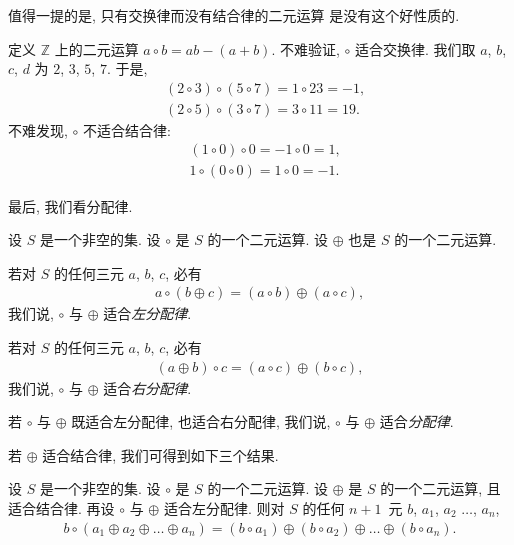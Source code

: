 值得一提的是, 只有交换律而没有结合律的二元运算%
是没有这个好性质的.

\begin{example}
    定义 \(\mathbb{Z}\) 上的二元运算
    \(a \circ b = ab - (a + b)\).
    不难验证, \(\circ\) 适合交换律.
    我们取 \(a\), \(b\), \(c\), \(d\)
    为 \(2\), \(3\), \(5\), \(7\).
    于是,
    \begin{align*}
         & (2 \circ 3) \circ (5 \circ 7) = 1 \circ 23 = -1, \\
         & (2 \circ 5) \circ (3 \circ 7) = 3 \circ 11 = 19.
    \end{align*}
    不难发现, \(\circ\) 不适合结合律:
    \begin{align*}
         & (1 \circ 0) \circ 0 = -1 \circ 0 = 1, \\
         & 1 \circ (0 \circ 0) = 1 \circ 0 = -1.
    \end{align*}
\end{example}

最后, 我们看分配律.

\begin{definition}
    设 \(S\) 是一个非空的集.
    设 \(\circ\) 是 \(S\) 的一个二元运算.
    设 \(\oplus\) 也是 \(S\) 的一个二元运算.

    若对 \(S\) 的任何三元 \(a\), \(b\), \(c\),
    必有
    \begin{align*}
        a \circ (b \oplus c)
        = (a \circ b) \oplus (a \circ c),
    \end{align*}
    我们说, \(\circ\) 与 \(\oplus\) 适合\emph{左分配律}.

    若对 \(S\) 的任何三元 \(a\), \(b\), \(c\),
    必有
    \begin{align*}
        (a \oplus b) \circ c
        = (a \circ c) \oplus (b \circ c),
    \end{align*}
    我们说, \(\circ\) 与 \(\oplus\) 适合\emph{右分配律}.

    若 \(\circ\) 与 \(\oplus\)
    既适合左分配律, 也适合右分配律,
    我们说,
    \(\circ\) 与 \(\oplus\) 适合\emph{分配律}.
\end{definition}

若 \(\oplus\) 适合结合律,
我们可得到如下三个结果.

\begin{theorem}
    设 \(S\) 是一个非空的集.
    设 \(\circ\) 是 \(S\) 的一个二元运算.
    设 \(\oplus\) 是 \(S\) 的一个二元运算,
    且适合结合律.
    再设 \(\circ\) 与 \(\oplus\) 适合左分配律.
    则对 \(S\) 的任何 \(n + 1\)~元
    \(b\), \(a_1\), \(a_2\) \(\dots\), \(a_n\),
    \begin{align*}
        b \circ (a_1 \oplus a_2 \oplus \dots \oplus a_n)
        =
        (b \circ a_1) \oplus (b \circ a_2) \oplus
        \dots \oplus (b \circ a_n).
    \end{align*}
\end{theorem}

